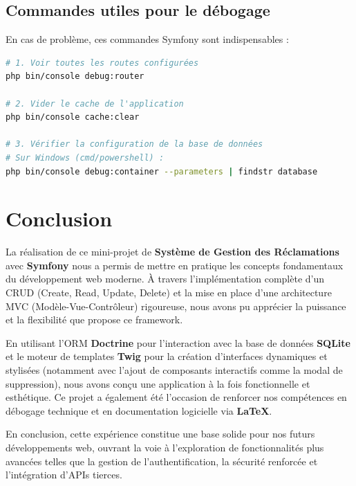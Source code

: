 \documentclass[12pt,a4paper]{article}
\begin{document}
\subsection{Commandes utiles pour le débogage}
En cas de problème, ces commandes Symfony sont indispensables :

\begin{lstlisting}[language=bash, caption=Commandes de diagnostic]
# 1. Voir toutes les routes configurées
php bin/console debug:router

# 2. Vider le cache de l'application
php bin/console cache:clear

# 3. Vérifier la configuration de la base de données
# Sur Windows (cmd/powershell) :
php bin/console debug:container --parameters | findstr database
\end{lstlisting}

\section{Conclusion}
La réalisation de ce mini-projet de \textbf{Système de Gestion des Réclamations} avec \textbf{Symfony} nous a permis de mettre en pratique les concepts fondamentaux du développement web moderne. À travers l'implémentation complète d'un CRUD (Create, Read, Update, Delete) et la mise en place d'une architecture MVC (Modèle-Vue-Contrôleur) rigoureuse, nous avons pu apprécier la puissance et la flexibilité que propose ce framework.

En utilisant l'ORM \textbf{Doctrine} pour l'interaction avec la base de données \textbf{SQLite} et le moteur de templates \textbf{Twig} pour la création d'interfaces dynamiques et stylisées (notamment avec l'ajout de composants interactifs comme la modal de suppression), nous avons conçu une application à la fois fonctionnelle et esthétique. Ce projet a également été l'occasion de renforcer nos compétences en débogage technique et en documentation logicielle via \textbf{LaTeX}.

En conclusion, cette expérience constitue une base solide pour nos futurs développements web, ouvrant la voie à l'exploration de fonctionnalités plus avancées telles que la gestion de l'authentification, la sécurité renforcée et l'intégration d'APIs tierces.
\end{document}

